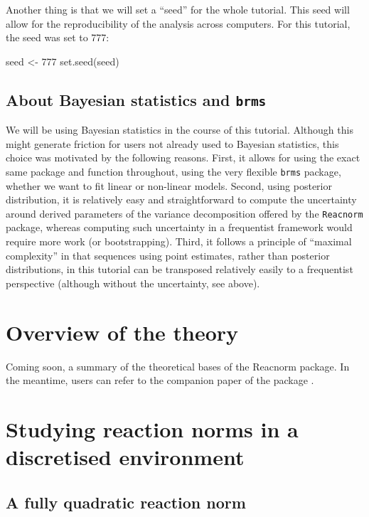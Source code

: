 \documentclass[a4paper,12pt,twoside]{article}
\begin{document}
Another thing is that we will set a ``seed'' for the whole tutorial. This seed will allow for the reproducibility of the analysis across computers.
For this tutorial, the seed was set to 777:
\begin{Rinput}
seed <- 777
set.seed(seed)
\end{Rinput}

\subsection{About Bayesian statistics and \texttt{brms}}
\label{subsec_brms}

We will be using Bayesian statistics in the course of this tutorial. Although this might generate friction for users not already used to Bayesian statistics, this choice was motivated by the following reasons.
First, it allows for using the exact same package and function throughout, using the very flexible \texttt{brms} package, whether we want to fit linear or non-linear models.
Second, using posterior distribution, it is relatively easy and straightforward to compute the uncertainty around derived parameters of the variance decomposition offered by the \texttt{Reacnorm} package, whereas computing such uncertainty in a frequentist framework would require more work (or bootstrapping).
Third, it follows a principle of ``maximal complexity'' in that sequences using point estimates, rather than posterior distributions, in this tutorial can be transposed relatively easily to a frequentist perspective (although without the uncertainty, see above).


\section{Overview of the theory}

Coming soon, a summary of the theoretical bases of the Reacnorm package. In the meantime, users can refer to the companion paper of the package \autocite{devillemereuil_partitioning_2023}.


\section{Studying reaction norms in a discretised environment}

\subsection{A fully quadratic reaction norm}
\end{document}
